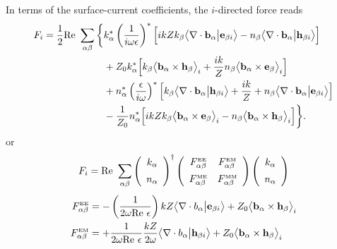 In terms of the surface-current coefficients, the $i$-directed force reads 
\begin{align*}
 F_i
= \frac{1}{2}\text{Re }\sum_{\alpha\beta}
 \bigg\{&
   k^*_\alpha\left(\frac{1}{i\omega \epsilon}\right)^*
    \Big[ ikZ k_\beta \big\langle \nabla \cdot \mathbf{b}_\alpha \big| \mathbf{e}_{\beta i} \big\rangle
             -n_\beta  \big\langle \nabla \cdot \mathbf{b}_\alpha \big| \mathbf{h}_{\beta i} \big\rangle
    \Big]
\\
&+ Z_0 k^*_\alpha
    \Big[ k_\beta \big\langle \mathbf{b}_\alpha \times \mathbf{h}_\beta\big\rangle_i
         +\frac{ik}{Z} n_\beta \big\langle \mathbf{b}_\alpha \times \mathbf{e}_\beta\big\rangle_i
    \Big]
\\
&+
   n^*_\alpha\left(\frac{\epsilon}{i\omega}\right)^*
    \Big[ k_\beta \big\langle \nabla \cdot \mathbf{b}_\alpha \big| \mathbf{h}_{\beta i} \big\rangle
         +\frac{ik}{Z} +n_\beta \big\langle \nabla \cdot \mathbf{b}_\alpha \big| \mathbf{e}_{\beta i} \big\rangle
    \Big]
\\
&- \frac{1}{Z_0} n^*_\alpha
    \Big[ ikZ k_\beta \big\langle \mathbf{b}_\alpha \times \mathbf{e}_\beta\big\rangle_i
          -n_\beta \big\langle \mathbf{b}_\alpha \times \mathbf{h}_\beta\big\rangle_i
    \Big] \bigg\}.
\end{align*}
or 
$$
 F_i
  = \text{Re }\sum_{\alpha\beta}
    \left(
     \begin{array}{c}
      k_\alpha \\[5pt]
      n_\alpha
     \end{array}
    \right) ^\dagger
    \left(\begin{array}{cc}
     F^{\hbox{\tiny{EE}}}_{\alpha\beta} & 
     F^{\hbox{\tiny{EM}}}_{\alpha\beta} \\[5pt]
     F^{\hbox{\tiny{ME}}}_{\alpha\beta} &
     F^{\hbox{\tiny{MM}}}_{\alpha\beta}
     \end{array}
    \right)
    \left(
     \begin{array}{c}
      k_\alpha \\[5pt]
      n_\alpha
     \end{array}
    \right)
$$
\begin{align*}
 F^{\hbox{\tiny{EE}}}_{\alpha\beta}
 &=
 -\left(\frac{1}{2\omega \text{Re }\epsilon}\right)
  kZ \big\langle \nabla \cdot b_\alpha \big| \mathbf{e}_{\beta i} \big\rangle
               +Z_0  \big\langle \mathbf{b}_\alpha \times \mathbf{h}_\beta\big\rangle_i 
\\
 F^{\hbox{\tiny{EM}}}_{\alpha\beta}
 &=
 +\frac{1}{2\omega \text{Re }\epsilon}
  \frac{kZ}{2\omega} \big\langle \nabla \cdot b_\alpha \big| \mathbf{h}_{\beta i} \big\rangle
               +Z_0  \big\langle \mathbf{b}_\alpha \times \mathbf{h}_\beta\big\rangle_i 
\\
\end{align*}
